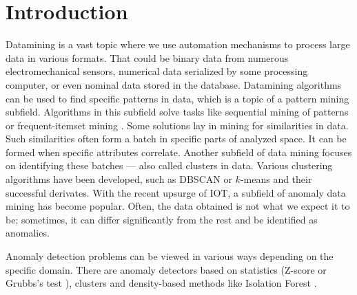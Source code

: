 \section{Introduction}
\label{sec:introduction}





Datamining is a vast topic where we use automation mechanisms to process large data in various formats. That could be binary data from numerous electromechanical sensors, numerical data serialized by some processing computer, or even nominal data stored in the database.
Datamining algorithms can be used to find specific patterns in data, which is a topic of a pattern mining subfield. Algorithms in this subfield solve tasks like sequential mining of patterns \cite{agrawal1995mining} or frequent-itemset mining \cite{agrawal1994fast}. 
Some solutions lay in mining for similarities in data. Such similarities often form a batch in specific parts of analyzed space. It can be formed when specific attributes correlate. Another subfield of data mining focuses on identifying these batches --- also called clusters in data. Various clustering algorithms have been developed, such as DBSCAN \cite{Ester1996dbscan} or \(k\)-means \cite{lloyd1982kmeans} and their successful derivates.
With the recent upsurge of IOT, a subfield of anomaly data mining has become popular. Often, the data obtained is not what we expect it to be; sometimes, it can differ significantly from the rest and be identified as anomalies.



Anomaly detection problems can be viewed in various ways depending on the specific domain. There are anomaly detectors based on statistics (Z-score or Grubbs's test \cite{grubbs1949sample}), clusters \cite{he2003discovering} and density-based methods like Isolation Forest \cite{liu2008isolation, liu2012isolation}.


